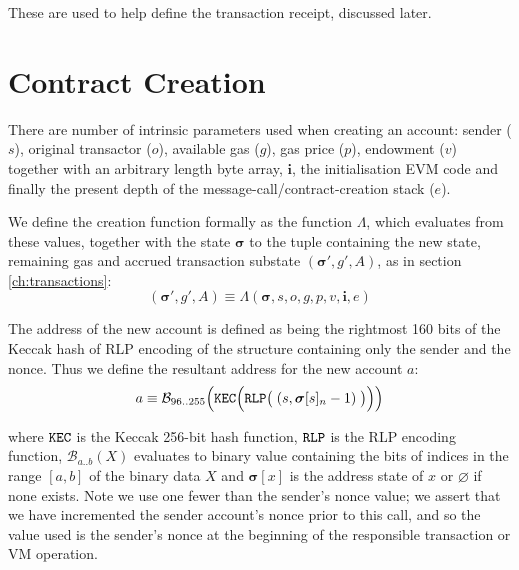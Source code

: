 \documentclass[9pt,oneside]{amsart}
\begin{document}
\begin{multicols}{2}
These are used to help define the transaction receipt, discussed later.


\section{Contract Creation} \label{ch:create}

There are number of intrinsic parameters used when creating an account: sender ($s$), original transactor ($o$), available gas ($g$), gas price ($p$), endowment ($v$) together with an arbitrary length byte array, $\mathbf{i}$, the initialisation EVM code and finally the present depth of the message-call/contract-creation stack ($e$).

We define the creation function formally as the function $\Lambda$, which evaluates from these values, together with the state $\boldsymbol{\sigma}$ to the tuple containing the new state, remaining gas and accrued transaction substate $(\boldsymbol{\sigma}', g', A)$, as in section \ref{ch:transactions}:
\begin{equation}
(\boldsymbol{\sigma}', g', A) \equiv \Lambda(\boldsymbol{\sigma}, s, o, g, p, v, \mathbf{i}, e)
\end{equation}

The address of the new account is defined as being the rightmost 160 bits of the Keccak hash of RLP encoding of the structure containing only the sender and the nonce. Thus we define the resultant address for the new account $a$:
\begin{equation}
a \equiv \mathcal{B}_{96..255}\Big(\mathtt{\tiny KEC}\Big(\mathtt{\tiny RLP}\big(\;(s, \boldsymbol{\sigma}[s]_n - 1)\;\big)\Big)\Big)
\end{equation}

where $\mathtt{\tiny KEC}$ is the Keccak 256-bit hash function, $\mathtt{\tiny RLP}$ is the RLP encoding function, $\mathcal{B}_{a..b}(X)$ evaluates to binary value containing the bits of indices in the range $[a, b]$ of the binary data $X$ and $\boldsymbol{\sigma}[x]$ is the address state of $x$ or $\varnothing$ if none exists. Note we use one fewer than the sender's nonce value; we assert that we have incremented the sender account's nonce prior to this call, and so the value used is the sender's nonce at the beginning of the responsible transaction or VM operation.


\end{multicols}
\end{document}
